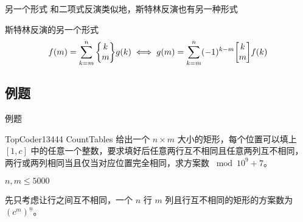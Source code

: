 \documentclass[UTF8]{beamer}
\begin{document}
    \begin{frame}{另一个形式}
        和二项式反演类似地，斯特林反演也有另一种形式
        \begin{block}{斯特林反演的另一个形式}
            $$
            f(m)=\sum_{k=m}^n \St km g(k)\iff g(m) = \sum_{k=m}^n (-1)^{k-m}\st km f(k)
            $$
        \end{block}
    \end{frame}

    \subsection{例题}
    \begin{frame}{例题}
        \begin{block}{TopCoder13444 CountTables}
            给出一个 $n\times m$ 大小的矩形，每个位置可以填上 $[1,c]$ 中的任意一个整数，要求填好后任意两行互不相同且任意两列互不相同，两行或两列相同当且仅当对应位置完全相同，求方案数 $\bmod 10^9+7$。

            $n,m\le 5000$
        \end{block}
        \pause

        先只考虑让行之间互不相同，一个 $n$ 行 $m$ 列且行互不相同的矩形的方案数为 $(c^m)^{\underline{n}}$。

    \end{frame}
\end{document}
